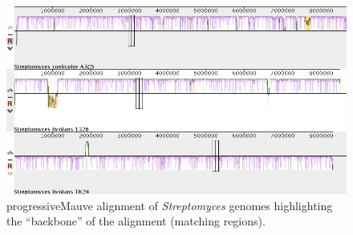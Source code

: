 \documentclass[12pt]{article}
\newcommand{\p}{progressiveMauve\xspace}
\newcommand{\strep}{\textit{Streptomyces}\xspace}
\begin{document}
\begin{figure}
	\includegraphics[width=0.9\linewidth]{./strep_mauve_backbone_aln_pic_27Mar20.jpg}
	\caption{\label{fig:strep_mauve}\p alignment of \strep genomes highlighting the ``backbone'' of the alignment (matching regions).}
\end{figure}
\end{document}
